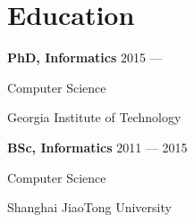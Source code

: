 \section{Education}
\parbox[t][][t]{\linewidth}{
	\parbox{\linewidth}{\textbf{PhD, Informatics} \hfill {{2015 --- }}}
	\parbox{\linewidth}{{Computer Science}}
	\parbox{\linewidth}{{Georgia Institute of Technology}}
	\smallskip
}


\parbox[t][][t]{\linewidth}{
	\parbox{\linewidth}{\textbf{BSc, Informatics} \hfill {{2011 --- 2015}}}
	\parbox{\linewidth}{{Computer Science}}
	\parbox{\linewidth}{{Shanghai JiaoTong University}}
	\smallskip
}


